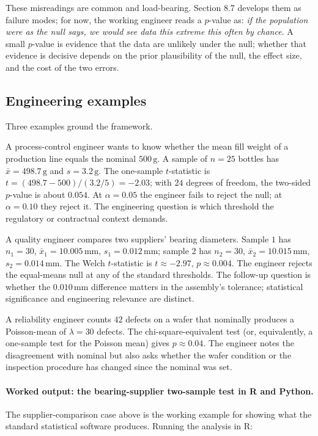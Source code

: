 These misreadings are common and load-bearing. Section 8.7 develops
them as failure modes; for now, the working engineer reads a
$p$-value as: \emph{if the population were as the null says, we would
see data this extreme this often by chance}. A small $p$-value is
evidence that the data are unlikely under the null; whether that
evidence is decisive depends on the prior plausibility of the null,
the effect size, and the cost of the two errors.

\subsection{Engineering examples}

Three examples ground the framework.

A process-control engineer wants to know whether the mean fill
weight of a production line equals the nominal $500 \,\si{\gram}$.
A sample of $n = 25$ bottles has $\bar{x} = 498.7 \,\si{\gram}$ and
$s = 3.2 \,\si{\gram}$. The one-sample $t$-statistic is $t = (498.7
- 500)/(3.2/5) = -2.03$; with $24$ degrees of freedom, the
two-sided $p$-value is about $0.054$. At $\alpha = 0.05$ the engineer
fails to reject the null; at $\alpha = 0.10$ they reject it. The
engineering question is which threshold the regulatory or contractual
context demands.

A quality engineer compares two suppliers' bearing diameters. Sample
$1$ has $n_{1} = 30$, $\bar{x}_{1} = 10.005 \,\si{\milli\meter}$,
$s_{1} = 0.012 \,\si{\milli\meter}$; sample $2$ has $n_{2} = 30$,
$\bar{x}_{2} = 10.015 \,\si{\milli\meter}$, $s_{2} = 0.014
\,\si{\milli\meter}$. The Welch $t$-statistic is $t \approx -2.97$,
$p \approx 0.004$. The engineer rejects the equal-means null at any
of the standard thresholds. The follow-up question is whether the
$0.010 \,\si{\milli\meter}$ difference matters in the assembly's
tolerance; statistical significance and engineering relevance are
distinct.

A reliability engineer counts $42$ defects on a wafer that nominally
produces a Poisson-mean of $\lambda = 30$ defects. The
chi-square-equivalent test (or, equivalently, a one-sample test for
the Poisson mean) gives $p \approx 0.04$. The engineer notes the
disagreement with nominal but also asks whether the wafer condition
or the inspection procedure has changed since the nominal was set.

\paragraph{Worked output: the bearing-supplier two-sample test in
R and Python.} The supplier-comparison case above is the
working example for showing what the standard statistical
software produces. Running the analysis in R:

